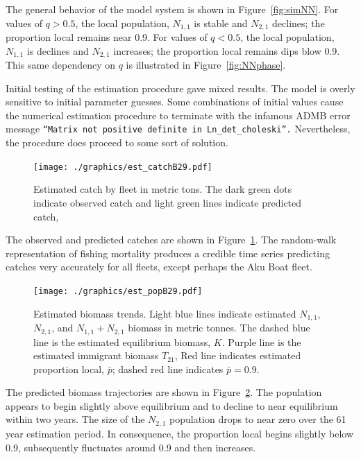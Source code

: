 \documentclass[12pt,letterpaper,twoside]{article}
\newcommand\None{{N_{1,1}}}
\newcommand\Ntwo{{N_{2,1}}}
\newcommand\Nsum{{N_{1,1}+N_{2,1}}}
\begin{document}
The general behavior of the model system is shown in
Figure~\ref{fig:simNN}. 
For values of $q>0.5$, the local population, $\None$ is stable and
$\Ntwo$ declines; the proportion local remains near 0.9.
For values of $q<0.5$, the local population, $\None$ is declines and
$\Ntwo$ increases; the proportion local remains dips blow 0.9.
This same dependency on $q$ is illustrated in
Figure~\ref{fig:NNphase}.


Initial testing of the estimation procedure gave mixed results. 
The model is overly sensitive to initial parameter guesses. Some
combinations of initial values cause the numerical estimation
procedure to terminate with the infamous ADMB error message 
{\tt ``Matrix not positive definite in Ln\_det\_choleski''.}
Nevertheless, the procedure does proceed to some sort of
solution.

\begin{figure}
\begin{center}
\texttt{[image: ./graphics/est\_catchB29.pdf]}
\caption{\label{fig:estC29}
Estimated catch by fleet in metric tons. 
The dark green dots indicate observed catch
and light green lines indicate predicted catch,
}
\end{center}
\end{figure}
The observed and predicted catches are shown in Figure~\ref{fig:estC29}.
The random-walk representation of fishing mortality
produces a credible time series predicting catches very accurately for
all fleets, except perhaps the Aku Boat fleet.

\begin{figure}
\begin{center}
\texttt{[image: ./graphics/est\_popB29.pdf]}
\caption{\label{fig:estB}
Estimated biomass trends.
Light blue lines indicate estimated $\None$, $\Ntwo$, and $\Nsum$
biomass in metric tonnes.
The dashed blue line is the estimated equilibrium biomass, $K$.
Purple line is the estimated immigrant biomass $T_{21}$, 
Red line indicates estimated proportion local, $\bar{p}$; 
dashed red line indicates $\bar{p}=0.9$. 
}
\end{center}
\end{figure}
The predicted biomass trajectories are shown in
Figure~\ref{fig:estB}. The population appears to begin slightly above
equilibrium and to decline to near equilibrium within two years.
The size of the $\Ntwo$ population drops to near zero over the 61 year
estimation period.
In consequence, the proportion local begins slightly below 0.9,
subsequently fluctuates around 0.9 and then increases.
\end{document}
